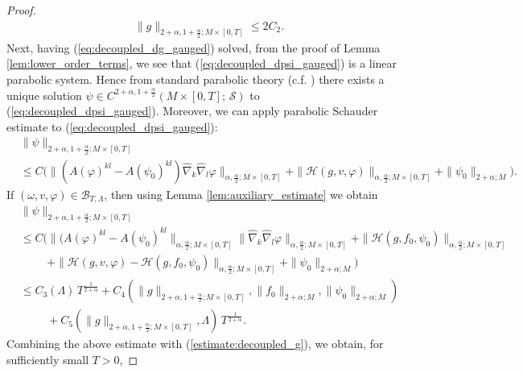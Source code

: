 \documentclass{amsart}
\theoremstyle{definition}
\theoremstyle{remark}
\numberwithin{equation}{section}
\begin{document}
\begin{proof}
	\begin{equation}\label{estimate:decoupled_g}
		\begin{aligned}
			\|g\|_{2+\alpha,1+\frac{\alpha}{2};M\times[0,T]} \leq 2C_2.
		\end{aligned}
	\end{equation}
	 Next, having (\ref{eq:decoupled_dg_gauged}) solved, from the proof of Lemma \ref{lem:lower_order_terms}, we see that (\ref{eq:decoupled_dpsi_gauged}) is a linear parabolic system. Hence from standard parabolic theory (c.f. \cite{LSU1968}) there exists a unique solution $\psi\in C^{2+\alpha,1+\frac{\alpha}{2}}(M\times [0,T];\,\mathcal{S})$ to (\ref{eq:decoupled_dpsi_gauged}). Moreover, we can apply parabolic Schauder estimate to (\ref{eq:decoupled_dpsi_gauged}):
	\begin{align*}
		&\|\psi\|_{2+\alpha,1+\frac{\alpha}{2};M\times[0,T]}\\[1ex]
		& \leq C \Big( \|(A(\varphi)^{kl} - A(\psi_0)^{kl})\hat{\nabla}_k\hat{\nabla}_l\varphi \|_{\alpha,\frac{\alpha}{2};M\times[0,T]} + \| \mathcal{H}(g, v,\varphi)\|_{\alpha,\frac{\alpha}{2};M\times[0,T]} + \|\psi_0\|_{2+\alpha;M}\Big).
	\end{align*}
	If $(\omega, v,\varphi)\in \mathcal{B}_{T,\Lambda}$, then using Lemma \ref{lem:auxiliary_estimate} we obtain
	\begin{equation}
		\begin{aligned}
			&\|\psi\|_{2+\alpha,1+\frac{\alpha}{2};M\times[0,T]}\\[1ex]
			&\leq  C \Big( \|(A(\varphi)^{kl} - A(\psi_0)^{kl}\|_{\alpha,\frac{\alpha}{2};M\times[0,T]} \|\hat{\nabla}_k\hat{\nabla}_l\varphi  \|_{\alpha,\frac{\alpha}{2};M\times[0,T]} + \| \mathcal{H}(g,f_0,\psi_0)\|_{\alpha,\frac{\alpha}{2};M\times[0,T]}\\[1ex]
			&\hspace{1cm} + \| \mathcal{H}(g, v,\varphi) - \mathcal{H}(g,f_0,\psi_0)\|_{\alpha,\frac{\alpha}{2};M\times[0,T]} + \|\psi_0\|_{2+\alpha;M}\Big)\\[1ex]
			&\leq C_3(\Lambda)\, T^{\frac{1}{2+\alpha}} + C_4(\|g\|_{2+\alpha,1+\frac{\alpha}{2};M\times[0,T]}, \|f_0\|_{2+\alpha;M}, \|\psi_0\|_{2+\alpha;M})  \\[1ex]
			&\hspace{1cm} + C_5(\|g\|_{2+\alpha,1+\frac{\alpha}{2};M\times[0,T]}, \Lambda) \, T^{\frac{1}{2+\alpha}}.
		\end{aligned}
	\end{equation}
	Combining the above estimate with (\ref{estimate:decoupled_g}), we obtain, for sufficiently small $T>0$, 

\end{proof}
\end{document}
